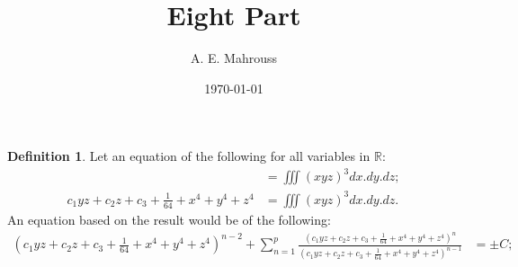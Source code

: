 \documentclass[10pt]{article}
\title{Eight Part}
\author{A. E. Mahrouss}
\date{\today}
\theoremstyle{plain}
\theoremstyle{definition}
\newtheorem{definition}[theorem]{Definition}
\theoremstyle{remark}
\begin{document}
\begin{definition}
	Let an equation of the following for all variables in $\mathbb{R}$:
	\begin{align*}
		&= \iiint (x y z)^{3} dx.dy.dz;\\
		c_{1} y z + c_{2} z + c_{3} + \frac{1}{64} + x^{4} + y^{4} + z^{4} &= \iiint (x y z)^{3} dx.dy.dz.
	\end{align*}
	An equation based on the result would be of the following:
	\begin{align*}
		(c_{1} y z + c_{2} z + c_{3} + \frac{1}{64} + x^{4} + y^{4} + z^{4})^{n-2} + \sum_{n=1}^{p} \frac{ (c_{1} y z + c_{2} z + c_{3} + \frac{1}{64} + x^{4} + y^{4} + z^{4})^{n}}{ (c_{1} y z + c_{2} z + c_{3} + \frac{1}{64} + x^{4} + y^{4} + z^{4})^{n-1}} &= \pm C;
	\end{align*}
\end{definition}

\nocite{*}


\end{document}
